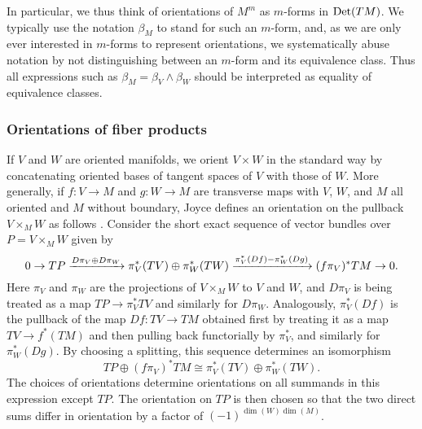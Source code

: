 In particular, we thus think of orientations of $M^m$ as $m$-forms in ${\rm Det}(TM)$.
We typically use the notation $\beta_M$ to stand for such an $m$-form, and, as we are only ever interested in $m$-forms to represent orientations, we systematically abuse notation by not distinguishing between an $m$-form and its equivalence class.
Thus all expressions such as $\beta_M = \beta_V \wedge \beta_W$ should be interpreted as equality of equivalence classes.

\subsubsection{Orientations of fiber products}

If $V$ and $W$ are oriented manifolds, we orient $V \times W$ in the standard way by concatenating oriented bases of tangent spaces of $V$ with those of $W$.
More generally, if $f \colon V \to M$ and $g \colon W \to M$ are transverse maps with $V$, $W$, and $M$ all oriented and $M$ without boundary, Joyce defines an orientation on the pullback $V \times_M W$ as follows \cite[Convention 7.2b]{Joy12}.
Consider the short exact sequence of vector bundles over $P = V \times_M W$ given by
\begin{equation}\label{E: fiber orientation}
	0 \to TP \xrightarrow{D\pi_V \oplus D\pi_W} \pi_V^*(TV) \oplus \pi_W^*(TW) \xrightarrow{\pi_V^*(Df)-\pi_W^*(Dg)} (f\pi_V)^*TM \to 0.
\end{equation}
Here $\pi_V$ and $\pi_W$ are the projections of $V \times_M W$ to $V$ and $W$, and $D\pi_V$ is being treated as a map $TP \to \pi_V^*TV$ and similarly for $D\pi_W$.
Analogously, $\pi_V^*(Df)$ is the pullback of the map $Df \colon TV \to TM$ obtained first by treating it as a map $TV \to f^*(TM)$ and then pulling back functorially by $\pi_V^*$, and similarly for $\pi_W^*(Dg)$.
By choosing a splitting, this sequence determines an isomorphism
\begin{equation*}
	TP \oplus (f\pi_V)^*TM\cong\pi_V^*(TV) \oplus \pi_W^*(TW).
\end{equation*}
The choices of orientations determine orientations on all summands in this expression except $TP$.
The orientation on $TP$ is then chosen so that the two direct sums differ in orientation by a factor of $(-1)^{\dim(W)\dim(M)}$.

